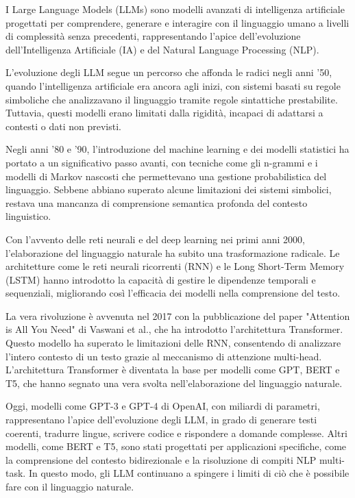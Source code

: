 \documentclass[a4paper,twoside,12pt]{toptesi}
\begin{document}
I Large Language Models (LLMs) sono modelli avanzati di intelligenza artificiale progettati per comprendere, generare e interagire con il linguaggio umano a livelli di complessità senza precedenti, rappresentando l'apice dell'evoluzione dell'Intelligenza Artificiale (IA) e del Natural Language Processing (NLP).

L'evoluzione degli LLM segue un percorso che affonda le radici negli anni '50, quando l'intelligenza artificiale era ancora agli inizi, con sistemi basati su regole simboliche che analizzavano il linguaggio tramite regole sintattiche prestabilite. Tuttavia, questi modelli erano limitati dalla rigidità, incapaci di adattarsi a contesti o dati non previsti.

Negli anni '80 e '90, l'introduzione del machine learning e dei modelli statistici ha portato a un significativo passo avanti, con tecniche come gli n-grammi e i modelli di Markov nascosti che permettevano una gestione probabilistica del linguaggio. Sebbene abbiano superato alcune limitazioni dei sistemi simbolici, restava una mancanza di comprensione semantica profonda del contesto linguistico.

Con l'avvento delle reti neurali e del deep learning nei primi anni 2000, l'elaborazione del linguaggio naturale ha subito una trasformazione radicale. Le architetture come le reti neurali ricorrenti (RNN) e le Long Short-Term Memory (LSTM) hanno introdotto la capacità di gestire le dipendenze temporali e sequenziali, migliorando così l'efficacia dei modelli nella comprensione del testo.

La vera rivoluzione è avvenuta nel 2017 con la pubblicazione del paper "Attention is All You Need" di Vaswani et al., che ha introdotto l'architettura Transformer. Questo modello ha superato le limitazioni delle RNN, consentendo di analizzare l'intero contesto di un testo grazie al meccanismo di attenzione multi-head. L'architettura Transformer è diventata la base per modelli come GPT, BERT e T5, che hanno segnato una vera svolta nell'elaborazione del linguaggio naturale.

Oggi, modelli come GPT-3 e GPT-4 di OpenAI, con miliardi di parametri, rappresentano l'apice dell'evoluzione degli LLM, in grado di generare testi coerenti, tradurre lingue, scrivere codice e rispondere a domande complesse. Altri modelli, come BERT e T5, sono stati progettati per applicazioni specifiche, come la comprensione del contesto bidirezionale e la risoluzione di compiti NLP multi-task. In questo modo, gli LLM continuano a spingere i limiti di ciò che è possibile fare con il linguaggio naturale.
\end{document}
